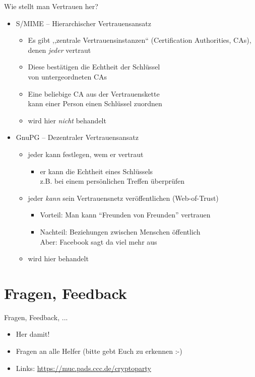   \begin{frame}{Wie stellt man Vertrauen her?}
    \begin{itemize}
      \item S/MIME -- Hierarchischer Vertrauensansatz
      \begin{itemize}
        \item Es gibt ,,zentrale Vertrauensinstanzen`` (Certification Authorities, CAs), denen \emph{jeder} vertraut
        \item Diese bestätigen die Echtheit der Schlüssel\\ von untergeordneten CAs
        \item Eine beliebige CA aus der Vertrauenskette\\ kann einer Person einen Schlüssel zuordnen
        \item wird hier \emph{nicht} behandelt
      \end{itemize}
      \item GnuPG -- Dezentraler Vertrauensansatz
      \begin{itemize}
        \item jeder kann festlegen, wem er vertraut
        \begin{itemize}
          \item er kann die Echtheit eines Schlüssels\\ z.B. bei einem persönlichen Treffen überprüfen
        \end{itemize}
        \item jeder \emph{kann} sein Vertrauensnetz veröffentlichen (Web-of-Trust)
        \begin{itemize}
          \item Vorteil: Man kann ``Freunden von Freunden'' vertrauen
          \item Nachteil: Beziehungen zwischen Menschen öffentlich\\ Aber: Facebook sagt da viel mehr aus
        \end{itemize}
        \item wird hier behandelt
      \end{itemize}
    \end{itemize}
  \end{frame}

\section{Fragen, Feedback}
  \begin{frame}{Fragen, Feedback, ...}
    \begin{itemize}
      \item{Her damit!}
      \item{Fragen an alle Helfer (bitte gebt Euch zu erkennen :-)}
      \item{Links: \url{https://muc.pads.ccc.de/cryptoparty}}
    \end{itemize}
  \end{frame}

